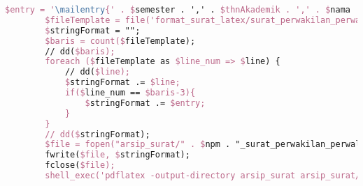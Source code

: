 \begin{lstlisting}[language=tex,basicstyle=\tiny,caption=HistorysuratController.php]
        $entry = '\mailentry{' . $semester . ',' . $thnAkademik . ',' . $nama . ',' . $prodi . ',' . $npm . ',' . $namaWakil . ',' . $prodiWakil . ',' . $npmWakil . ',' . $dosenWali . ',' . $alasan . ',' . $kodeMK1 . ',' . $matkul1 . ',' . $sks1 . ',' . $kodeMK2 . ',' . $matkul2 . ',' . $sks2 . ',' . $kodeMK3 . ',' . $matkul3 . ',' . $sks3 . ',' . $kodeMK4 . ',' . $matkul4 . ',' . $sks4 . ',' . $kodeMK5 . ',' . $matkul5 . ',' . $sks5 . ',' . $kodeMK6 . ',' . $matkul6 . ',' . $sks6 . ',' . $kodeMK7 . ',' . $matkul7 . ',' . $sks7 . ',' . $kodeMK8 . ',' . $matkul8 . ',' . $sks8 . ',' . $tanggal .  '}';
        $fileTemplate = file('format_surat_latex/surat_perwakilan_perwalian_8mk.tex');
        $stringFormat = "";
        $baris = count($fileTemplate);
        // dd($baris);
        foreach ($fileTemplate as $line_num => $line) {
            // dd($line);
            $stringFormat .= $line;
            if($line_num == $baris-3){
                $stringFormat .= $entry;
            }
        }
        // dd($stringFormat);
        $file = fopen("arsip_surat/" . $npm . "_surat_perwakilan_perwalian_8mk.tex", "w");
        fwrite($file, $stringFormat);
        fclose($file);
        shell_exec('pdflatex -output-directory arsip_surat arsip_surat/' . $npm . '_surat_perwakilan_perwalian_8mk.tex');


\end{lstlisting}

